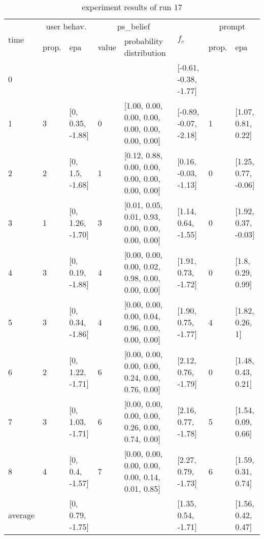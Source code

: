 \begin{table}[htbp]\footnotesize
\caption{experiment results of run 17}
\begin{tabular}{|p{0.4cm}|p{0.6cm}|l|p{0.6cm}|p{3.3cm}|l|p{0.6cm}|l|}
\hline

\multirow{2}{*}{time} & \multicolumn{2}{c|}{user behav.} & \multicolumn{2}{c|}{ps\_belief} &
\multirow{2}{*}{$f_c$} & \multicolumn{2}{c|}{prompt} \\ \cline{2-5}\cline{ 7- 8}
& prop. & epa & value & probability distribution &  & prop. & epa \\ \hline

0 & \multicolumn{1}{l|}{} &  & \multicolumn{1}{l|}{} &  & [-0.61, -0.38, -1.77] & \multicolumn{1}{l|}{} &  \\ \hline
1 & 3 & [0, 0.35, -1.88] & 0 & [1.00, 0.00, 0.00, 0.00, 0.00, 0.00, 0.00, 0.00] & [-0.89, -0.07, -2.18] & 1 & [1.07, 0.81, 0.22] \\ \hline
2 & 2 & [0, 1.5, -1.68] & 1 & [0.12, 0.88, 0.00, 0.00, 0.00, 0.00, 0.00, 0.00] & [0.16, -0.03, -1.13] & 0 & [1.25, 0.77, -0.06] \\ \hline
3 & 1 & [0, 1.26, -1.70] & 3 & [0.01, 0.05, 0.01, 0.93, 0.00, 0.00, 0.00, 0.00] & [1.14, 0.64, -1.55] & 0 & [1.92, 0.37, -0.03] \\ \hline
4 & 3 & [0, 0.19, -1.88] & 4 & [0.00, 0.00, 0.00, 0.02, 0.98, 0.00, 0.00, 0.00] & [1.91, 0.73, -1.72] & 0 & [1.8, 0.29, 0.99] \\ \hline
5 & 3 & [0, 0.34, -1.86] & 4 & [0.00, 0.00, 0.00, 0.04, 0.96, 0.00, 0.00, 0.00] & [1.90, 0.75, -1.77] & 4 & [1.82, 0.26, 1] \\ \hline
6 & 2 & [0, 1.22, -1.71] & 6 & [0.00, 0.00, 0.00, 0.00, 0.24, 0.00, 0.76, 0.00] & [2.12, 0.76, -1.79] & 0 & [1.48, 0.43, 0.21] \\ \hline
7 & 3 & [0, 1.03, -1.71] & 6 & [0.00, 0.00, 0.00, 0.00, 0.26, 0.00, 0.74, 0.00] & [2.16, 0.77, -1.78] & 5 & [1.54, 0.09, 0.66] \\ \hline
8 & 4 & [0, 0.4, -1.57] & 7 & [0.00, 0.00, 0.00, 0.00, 0.00, 0.14, 0.01, 0.85] & [2.27, 0.79, -1.73] & 6 & [1.59, 0.31, 0.74] \\ \hline
\multicolumn{1}{|l|}{average} & \multicolumn{1}{l|}{} & [0, 0.79, -1.75] & \multicolumn{1}{l|}{} &  & [1.35, 0.54, -1.71] & \multicolumn{1}{l|}{} & [1.56, 0.42, 0.47] \\ \hline
\end{tabular}
\label{}
\end{table}



